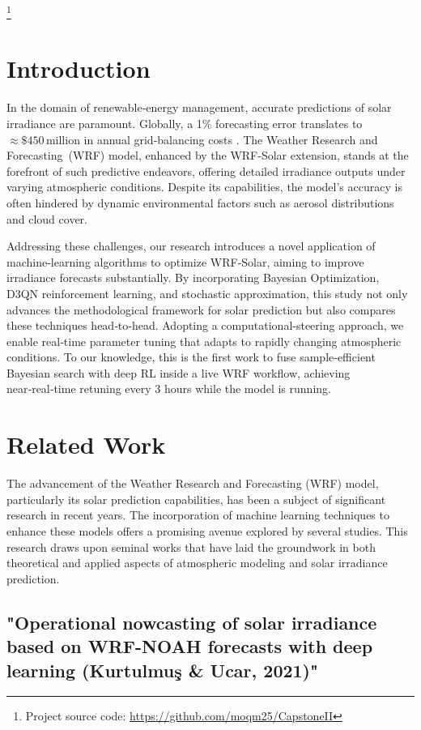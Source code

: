 \documentclass[conference]{IEEEtran}
\begin{document}
\footnote{Project source code: \url{https://github.com/moqm25/CapstoneII}}

\section{Introduction}

In the domain of renewable‑energy management, accurate predictions of solar irradiance are paramount. Globally, a 1\% forecasting error translates to $\approx\$450\,\text{million}$ in annual grid‑balancing costs \cite{IEA2024}. The Weather Research and Forecasting (WRF) model, enhanced by the WRF‑Solar extension, stands at the forefront of such predictive endeavors, offering detailed irradiance outputs under varying atmospheric conditions. Despite its capabilities, the model’s accuracy is often hindered by dynamic environmental factors such as aerosol distributions and cloud cover.

Addressing these challenges, our research introduces a novel application of machine‑learning algorithms to optimize WRF‑Solar, aiming to improve irradiance forecasts substantially. By incorporating Bayesian Optimization, D3QN reinforcement learning, and stochastic approximation, this study not only advances the methodological framework for solar prediction but also compares these techniques head‑to‑head. Adopting a computational‑steering approach, we enable real‑time parameter tuning that adapts to rapidly changing atmospheric conditions. To our knowledge, this is the first work to fuse sample‑efficient Bayesian search with deep RL inside a live WRF workflow, achieving near‑real‑time retuning every 3 hours while the model is running.


\section{Related Work}
The advancement of the Weather Research and Forecasting (WRF) model, particularly its solar prediction capabilities, has been a subject of significant research in recent years. The incorporation of machine learning techniques to enhance these models offers a promising avenue explored by several studies. This research draws upon seminal works that have laid the groundwork in both theoretical and applied aspects of atmospheric modeling and solar irradiance prediction.

\subsection{"Operational nowcasting of solar irradiance based on WRF-NOAH forecasts with deep learning (Kurtulmuş \& Ucar, 2021)"}
\end{document}
